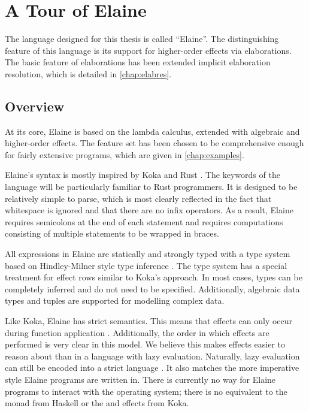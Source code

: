 \chapter{A Tour of Elaine}\label{chap:basics}

The language designed for this thesis is called ``Elaine''. The distinguishing feature of this language is its support for higher-order effects via elaborations. The basic feature of elaborations has been extended implicit elaboration resolution, which is detailed in \cref{chap:elabres}.

\section{Overview}

At its core, Elaine is based on the lambda calculus, extended with algebraic and higher-order effects. The feature set has been chosen to be comprehensive enough for fairly extensive programs, which are given in \cref{chap:examples}.

Elaine's syntax is mostly inspired by Koka \autocite{leijen_koka_2014,leijen_type_2017} and Rust \autocite{matsakis_rust_2014}. The keywords of the language will be particularly familiar to Rust programmers. It is designed to be relatively simple to parse, which is most clearly reflected in the fact that whitespace is ignored and that there are no infix operators. As a result, Elaine requires semicolons at the end of each statement and requires computations consisting of multiple statements to be wrapped in braces.

All expressions in Elaine are statically and strongly typed with a type system based on Hindley-Milner style type inference \autocite{hindley_principal_1969,milner_theory_1978}. The type system has a special treatment for effect rows similar to Koka's approach. In most cases, types can be completely inferred and do not need to be specified. Additionally, algebraic data types and tuples are supported for modelling complex data.

Like Koka, Elaine has strict semantics. This means that effects can only occur during function application \autocite{leijen_koka_2014}. Additionally, the order in which effects are performed is very clear in this model. We believe this makes effects easier to reason about than in a language with lazy evaluation. Naturally, lazy evaluation can still be encoded into a strict language \autocite{wadler_lazy_1996}. It also matches the more imperative style Elaine programs are written in. There is currently no way for Elaine programs to interact with the operating system; there is no equivalent to the  monad from Haskell or the  and  effects from Koka.

